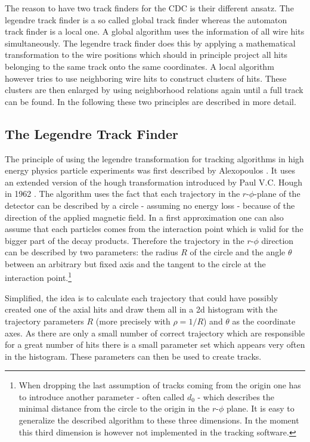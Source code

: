 The reason to have two track finders for the CDC is their different ansatz. The legendre track finder is a so called global track finder whereas the automaton track finder is a local one. A global algorithm uses the information of all wire hits simultaneously. The legendre track finder does this by applying a mathematical transformation to the wire positions which should in principle project all hits belonging to the same track onto the same coordinates. A local algorithm however tries to use neighboring wire hits to construct clusters of hits. These clusters are then enlarged by using neighborhood relations again until a full track can be found. In the following these two principles are described in more detail.

\subsection{The Legendre Track Finder}
The principle of using the legendre transformation for tracking algorithms in high energy physics particle experiments was first described by Alexopoulos \cite{legendre}. It uses an extended version of the hough transformation introduced by Paul V.C. Hough in 1962 \cite{hough}. The algorithm uses the fact that each trajectory in the $r$-$\phi$-plane of the detector can be described by a circle - assuming no energy loss - because of the direction of the applied magnetic field. In a first approximation one can also assume that each particles comes from the interaction point which is valid for the bigger part of the decay products. Therefore the trajectory in the $r$-$\phi$ direction can be described by two parameters: the radius $R$ of the circle and the angle $\theta$ between an arbitrary but fixed axis and the tangent to the circle at the interaction point.\footnote{When dropping the last assumption of tracks coming from the origin one has to introduce another parameter - often called $d_0$ - which describes the minimal distance from the circle to the origin in the $r$-$\phi$ plane. It is easy to generalize the described algorithm to these three dimensions. In the moment this third dimension is however not implemented in the tracking software.}

Simplified, the idea is to calculate each trajectory that could have possibly created one of the axial hits and draw them all in a 2d histogram with the trajectory parameters $R$ (more precisely with $\rho = 1/R$) and $\theta$ as the coordinate axes. As there are only a small number of correct trajectory which are responsible for a great number of hits there is a small parameter set which appears very often in the histogram. These parameters can then be used to create tracks.

